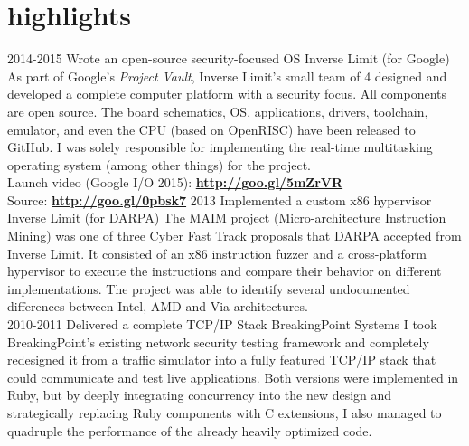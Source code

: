 \documentclass[]{friggeri-cv}
\begin{document}
\section{highlights}

\begin{entrylist}
  \entry
      {2014-2015}
      {Wrote an open-source security-focused OS}
      {Inverse Limit (for Google)}
      {
        As part of Google's \emph{Project Vault}, Inverse Limit's small team of 4 designed and developed a complete computer platform with a security focus. All components are open source. The board schematics, OS, applications, drivers, toolchain, emulator, and even the CPU (based on OpenRISC) have been released to GitHub. I was solely responsible for implementing the real-time multitasking operating system (among other things) for the project.\\
%        

        Launch video (Google I/O 2015): \hfill \href{http://goo.gl/5mZrVR}{\textbf{http://goo.gl/5mZrVR}}\\
        Source: \hfill \href{http://goo.gl/0pbsk7}{\textbf{http://goo.gl/0pbsk7}}
      }
  \entry
      {2013}
      {Implemented a custom x86 hypervisor}
      {Inverse Limit (for DARPA)}
      {The MAIM project (Micro-architecture Instruction Mining) was one of three Cyber Fast Track proposals that DARPA accepted from Inverse Limit. It consisted of an x86 instruction fuzzer and a cross-platform hypervisor to execute the instructions and compare their behavior on different implementations. The project was able to identify several undocumented differences between Intel, AMD and Via architectures.\\

      }
  \entry
      {2010-2011}
      {Delivered a complete TCP/IP Stack}
      {BreakingPoint Systems}
      {I took BreakingPoint's existing network security testing framework and completely redesigned it from a traffic simulator into a fully featured TCP/IP stack that could communicate and test live applications. Both versions were implemented in Ruby, but by deeply integrating concurrency into the new design and strategically replacing Ruby components with C extensions, I also managed to quadruple the performance of the already heavily optimized code.}
\end{entrylist}
\newpage
\end{document}
